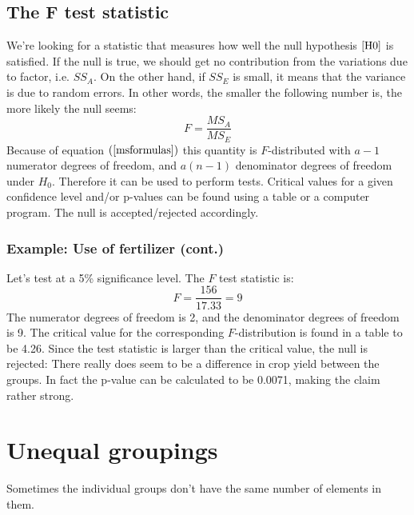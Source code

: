 \documentclass[12pt, a4paper]{article}
\begin{document}
\subsection{The F test statistic}
We're looking for a statistic that measures how well the null hypothesis $\ref{H0}$ is satisfied. If the null is true, we should get no contribution from the variations due to factor, i.e. $SS_A$. On the other hand, if $SS_E$ is small, it means that the variance is due to random errors. In other words, the smaller the following number is, the more likely the null seems:
\begin{equation}
\label{Fscore}
F=\frac{MS_A}{MS_E}
\end{equation}
Because of equation $(\ref{msformulas})$ this quantity is $F$-distributed with $a-1$ numerator degrees of freedom, and $a(n-1)$ denominator degrees of freedom under $H_0$. Therefore it can be used to perform tests. Critical values for a given confidence level and/or p-values can be found using a table or a computer program. The null is accepted/rejected accordingly.

\subsubsection{Example: Use of fertilizer (cont.)}
Let's test at a 5\% significance level. The $F$ test statistic is:
\begin{equation}
F=\frac{156}{17.33}=9
\end{equation}
The numerator degrees of freedom is 2, and the denominator degrees of freedom is 9. The critical value for the corresponding $F$-distribution is found in a table to be 4.26. Since the test statistic is larger than the critical value, the null is rejected: There really does seem to be a difference in crop yield between the groups. In fact the p-value can be calculated to be 0.0071, making the claim rather strong.

\section{Unequal groupings}
Sometimes the individual groups don't have the same number of elements in them.
\end{document}
